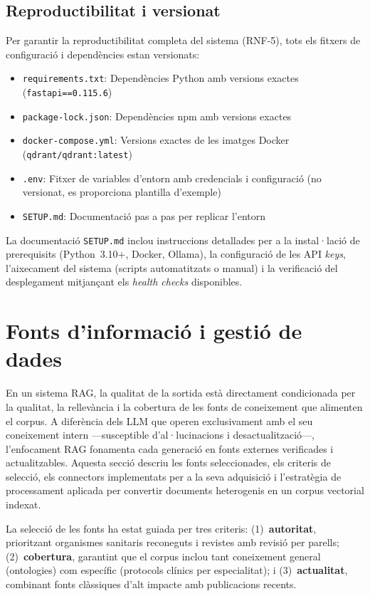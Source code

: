 \documentclass[CAT]{TFUOC}%
\begin{document}
\subsection{Reproductibilitat i versionat}

Per garantir la reproductibilitat completa del sistema (RNF-5), tots els fitxers de configuració i dependències estan versionats:

\begin{itemize}
    \item \texttt{requirements.txt}: Dependències Python amb versions exactes (\texttt{fastapi==0.115.6})
    \item \texttt{package-lock.json}: Dependències npm amb versions exactes
    \item \texttt{docker-compose.yml}: Versions exactes de les imatges Docker (\texttt{qdrant/qdrant:latest})
    \item \texttt{.env}: Fitxer de variables d'entorn amb credencials i configuració (no versionat, es proporciona plantilla d'exemple)
    \item \texttt{SETUP.md}: Documentació pas a pas per replicar l'entorn
\end{itemize}

La documentació \texttt{SETUP.md} inclou instruccions detallades per a la instal·lació de prerequisits (Python~3.10+, Docker, Ollama), la configuració de les API \textit{keys}, l'aixecament del sistema (scripts automatitzats o manual) i la verificació del desplegament mitjançant els \textit{health checks} disponibles.

\section{Fonts d'informació i gestió de dades}
\label{sec:fonts}

En un sistema RAG, la qualitat de la sortida està directament condicionada per la qualitat, la rellevància i la cobertura de les fonts de coneixement que alimenten el corpus. A diferència dels LLM que operen exclusivament amb el seu coneixement intern ---susceptible d'al·lucinacions i desactualització---, l'enfocament RAG fonamenta cada generació en fonts externes verificades i actualitzables. Aquesta secció descriu les fonts seleccionades, els criteris de selecció, els connectors implementats per a la seva adquisició i l'estratègia de processament aplicada per convertir documents heterogenis en un corpus vectorial indexat.

La selecció de les fonts ha estat guiada per tres criteris: (1)~\textbf{autoritat}, prioritzant organismes sanitaris reconeguts i revistes amb revisió per parells; (2)~\textbf{cobertura}, garantint que el corpus inclou tant coneixement general (ontologies) com específic (protocols clínics per especialitat); i (3)~\textbf{actualitat}, combinant fonts clàssiques d'alt impacte amb publicacions recents.
\end{document}
